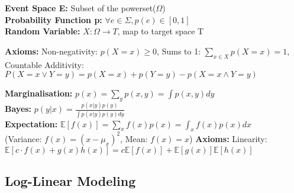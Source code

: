 \textbf{Event Space E:} Subset of the powerset($\Omega$)\\

\textbf{Probability Function p:} $\forall e \in \Sigma, p(e) \in [0,1]$\\

\textbf{Random Variable:} $X: \Omega \rightarrow T$, map to target space T\\
\begin{comment}
	Assume tossing of two coins and counting the number of heads, f.e. X(ht) = 1. 
	Target space is {0,1,2}.\\
	$\Rightarrow$ A random variable is a deterministic function, not a random variable.\\
	\textbf{Note:} Independence and correlation are properties of random variables, not the action space. We use Random variables to model properties of elements of the sample space.\\
\end{comment}

\textbf{Axioms:} Non-negativity: $p(X=x) \geq 0$, 
Sums to 1: $\sum_{x\in X} p(X=x) = 1$, 
Countable Additivity: $P(X=x \lor Y=y) = p(X=x) + p(Y=y) - p(X=x \land Y=y)$\\
\begin{comment}
	If all events are disjoint, then $p(\cup_i X_i) = \sum_i X_i$\\
\end{comment}

\textbf{Marginalisation:} $p(x) = \sum_y p(x,y) = \int p(x,y)dy$\\

\textbf{Bayes:} $p(y|x) = \frac{p(x|y) p(y)}{\int p(x|y)p(y) dy}$\\

\textbf{Expectation:} $\mathbb{E}[f(x)] = \sum_x f(x)p(x) = \int_x f(x)p(x) dx$\\
(Variance: $f(x) = (x - \mu_x)^2$, Mean: $f(x) = x$)
\textbf{Axioms:} Linearity: $\mathbb{E}[c\cdot f(x)+ g(x)h(x)] = c\mathbb{E}[f(x)] + \mathbb{E}[g(x)]\mathbb{E}[h(x)]$\\



\subsection{Log-Linear Modeling}

